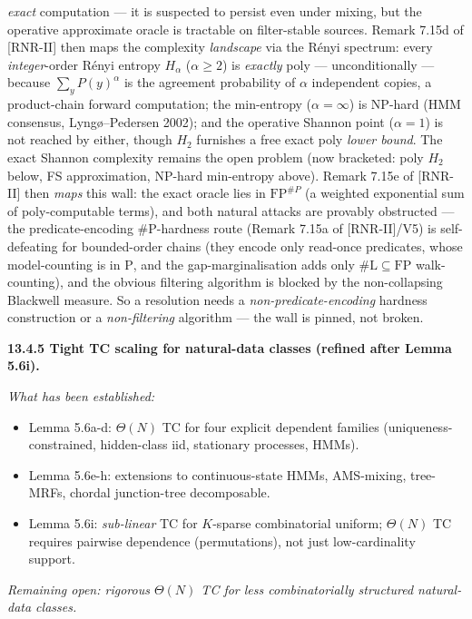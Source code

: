 \documentclass[
]{article}
\begin{document}
\emph{exact} computation --- it is suspected to persist even under mixing, but
the operative approximate oracle is tractable on filter-stable sources. Remark
7.15d of [RNR-II] then maps the complexity \emph{landscape} via the R\'enyi spectrum: every
\emph{integer}-order R\'enyi entropy $H_\alpha$ ($\alpha\ge2$) is \emph{exactly}
poly --- unconditionally --- because $\sum_y P(y)^\alpha$ is the agreement
probability of $\alpha$ independent copies, a product-chain forward computation;
the min-entropy ($\alpha=\infty$) is NP-hard (HMM consensus, Lyng\o{}--Pedersen
2002); and the operative Shannon point ($\alpha=1$) is not reached by either,
though $H_2$ furnishes a free exact poly \emph{lower bound}. The exact Shannon
complexity remains the open problem (now bracketed: poly $H_2$ below, FS
approximation, NP-hard min-entropy above). Remark 7.15e of [RNR-II] then \emph{maps} this wall:
the exact oracle lies in $\mathrm{FP}^{\#P}$ (a weighted exponential sum of
poly-computable terms), and both natural attacks are provably obstructed --- the
predicate-encoding \#P-hardness route (Remark 7.15a of [RNR-II]/V5) is self-defeating for
bounded-order chains (they encode only read-once predicates, whose model-counting is
in $\mathrm P$, and the gap-marginalisation adds only $\#\mathrm L\subseteq\mathrm{FP}$
walk-counting), and the obvious filtering algorithm is blocked by the non-collapsing
Blackwell measure. So a resolution needs a \emph{non-predicate-encoding} hardness
construction or a \emph{non-filtering} algorithm --- the wall is pinned, not broken.

\textbf{13.4.5 Tight TC scaling for natural-data classes (refined
after Lemma 5.6i).}

\emph{What has been established:}
\begin{itemize}
\item Lemma 5.6a-d: $\Theta(N)$ TC for four explicit dependent
families (uniqueness-constrained, hidden-class iid, stationary
processes, HMMs).
\item Lemma 5.6e-h: extensions to continuous-state HMMs, AMS-mixing,
tree-MRFs, chordal junction-tree decomposable.
\item Lemma 5.6i: \emph{sub-linear} TC for $K$-sparse combinatorial
uniform; $\Theta(N)$ TC requires pairwise dependence (permutations),
not just low-cardinality support.
\end{itemize}

\emph{Remaining open: rigorous $\Theta(N)$ TC for less combinatorially
structured natural-data classes.}
\end{document}
